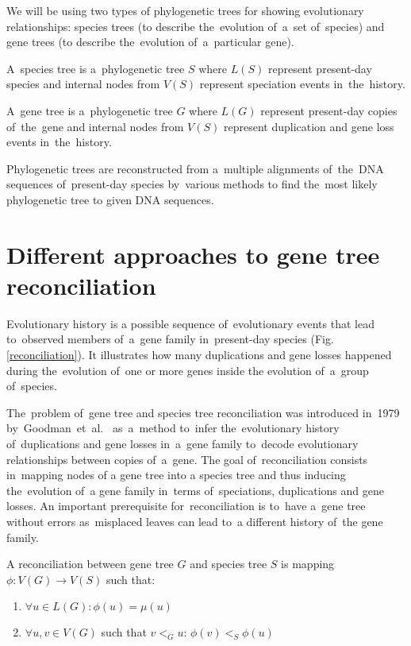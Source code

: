 We will be using two types of phylogenetic trees for showing evolutionary relationships: species trees (to describe the~evolution of~a~set of~species) and gene trees (to describe the~evolution of~a~particular gene).

A~species tree is a~phylogenetic tree $S$ where $L(S)$ represent present-day species and internal nodes from $V(S)$ represent speciation events in~the~history.

A~gene tree is a~phylogenetic tree $G$ where $L(G)$ represent present-day copies of~the~gene and internal nodes from $V(S)$ represent duplication and gene loss events in~the~history.

Phylogenetic trees are reconstructed from a~multiple alignments of~the~DNA sequences of~present-day species by~various methods \cite{felsenstein} to find the~most likely phylogenetic tree to given DNA sequences.

\section{Different approaches to gene tree reconciliation}
Evolutionary history is a possible sequence of~evolutionary events that lead to~observed members of~a~gene family in~present-day species (Fig. \ref{reconciliation}). It illustrates how many duplications and gene losses happened during the~evolution of~one or more genes inside the evolution of~a~group of~species.

The~problem of~gene tree and species tree reconciliation was introduced in~1979 by~Goodman~et~al.~\cite{goodman} as~a~method to~infer the~evolutionary history of~duplications and gene losses in~a~gene family to~decode evolutionary relationships between copies of~a~gene. The goal of~reconciliation consists in~mapping nodes of a gene tree into a species tree and thus inducing the~evolution of~a gene family in~terms of~speciations, duplications and gene losses. An important prerequisite for~reconciliation is to~have a~gene tree without errors as~misplaced leaves can lead to~a different history of~the gene family.

\begin{definition}
A reconciliation between gene tree $G$ and species tree $S$ is mapping $\phi: V(G) \rightarrow V(S)$ such that:
	\begin{enumerate}\itemsep0em
	\item $\forall u \in L(G): \phi(u) = \mu(u)$
	\item $\forall u, v \in V(G)$ such that $v<_Gu$: $\phi(v)<_S\phi(u)$
	\end{enumerate}
	\label{def_reconciliation}
\end{definition}

